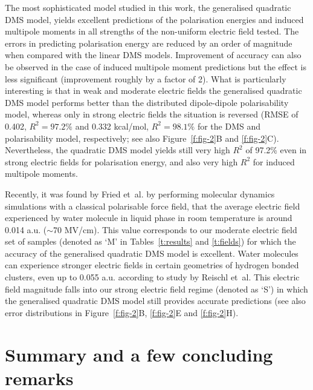 \documentclass[aip,amsmath,amssymb,reprint,floatfix]{revtex4-1}
\begin{document}
The most sophisticated model studied in this work, the generalised quadratic DMS model, yields excellent predictions 
of the polarisation energies and induced multipole moments in all strengths of the non\hyp{}uniform electric field tested.
The errors in predicting polarisation energy are reduced by an order of magnitude when compared with
the linear DMS models. Improvement of accuracy can also be observed in the case of induced multipole moment predictions
but the effect is less significant (improvement roughly by a factor of 2).
What is particularly interesting is that in weak and moderate electric fields
the generalised quadratic DMS model performs better than the distributed dipole\hyp{}dipole
polarisability model, whereas only in strong electric fields the situation is reversed
(RMSE of 0.402, $R^2=97.2\%$ and 0.332 kcal/mol, $R^2=98.1\%$ for the DMS and polarisability model, respectively; 
see also Figure~\ref{f:fig-2}B and \ref{f:fig-2}C).
Nevertheless, the quadratic DMS model yields still very high $R^2$ of 97.2\% 
even in strong electric fields for polarisation
energy, and also very high $R^2$ for induced multipole moments.

Recently, it was found by Fried et~al. by performing molecular dynamics simulations with a classical 
polarisable force field, that the average electric field experienced by water molecule in liquid phase
in room temperature is around 0.014 a.u. ($\sim$70 MV/cm).\cite{Fried.Wang.Boxer.Ren.Pande.JPCB.2013}
This value corresponds to our moderate electric field set of samples (denoted as `M' in Tables~\ref{t:results}
and \ref{t:fields}) for which the
accuracy of the generalised quadratic DMS model is excellent.
Water molecules can experience
stronger electric fields in certain geometries of hydrogen bonded clusters, 
even up to 0.055 a.u. according to study by Reischl et~al.\cite{Reischl.Kofinger.Dellago.MolPhys.2009} 
This electric field magnitude falls into our strong electric field regime (denoted as `S')
in which the generalised quadratic DMS model still provides accurate predictions (see also error distributions 
in Figure~\ref{f:fig-2}B, \ref{f:fig-2}E and \ref{f:fig-2}H). 



\section{\label{s:5}Summary and a few concluding remarks}
\end{document}
